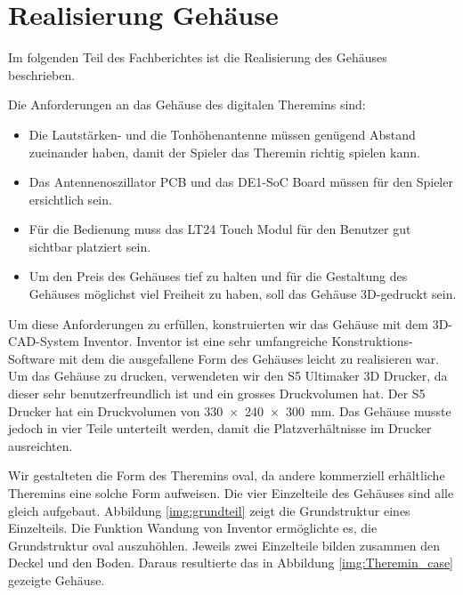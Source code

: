 \clearpage
\section{Realisierung Gehäuse}\label{sec:Realisierung Gehäuse}
Im folgenden Teil des Fachberichtes ist die Realisierung des Gehäuses beschrieben. 

Die Anforderungen an das Gehäuse des digitalen Theremins sind:
\begin{itemize}
	\item Die Lautstärken- und die Tonhöhenantenne müssen genügend Abstand zueinander haben, damit der Spieler das Theremin richtig spielen kann.
	\item Das Antennenoszillator PCB und das DE1-SoC Board müssen für den Spieler ersichtlich sein.
	\item Für die Bedienung muss das LT24 Touch Modul für den Benutzer gut sichtbar platziert sein.
	\item Um den Preis des Gehäuses tief zu halten und für die Gestaltung des Gehäuses möglichst viel Freiheit zu haben, soll das Gehäuse 3D-gedruckt sein.  
\end{itemize}

Um diese Anforderungen zu erfüllen, konstruierten wir das Gehäuse mit dem 3D-CAD-System Inventor. Inventor ist eine sehr umfangreiche Konstruktions-Software mit dem die ausgefallene Form des Gehäuses leicht zu realisieren war.
Um das Gehäuse zu drucken, verwendeten wir den S5 Ultimaker 3D Drucker, da dieser sehr benutzerfreundlich ist und ein grosses Druckvolumen hat. 
Der S5 Drucker hat ein Druckvolumen von \SI{330x240x300}{mm}. 
Das Gehäuse musste jedoch in vier Teile unterteilt werden, damit die Platzverhältnisse im Drucker ausreichten. 

Wir gestalteten die Form des Theremins oval, da andere kommerziell erhältliche Theremins eine solche Form aufweisen. Die vier Einzelteile des Gehäuses sind alle gleich aufgebaut. Abbildung \ref{img:grundteil} zeigt die Grundstruktur eines Einzelteils. Die Funktion Wandung von Inventor ermöglichte es, die Grundstruktur oval auszuhöhlen. Jeweils zwei Einzelteile bilden zusammen den Deckel und den Boden. Daraus resultierte das in Abbildung \ref{img:Theremin_case} gezeigte Gehäuse. 

